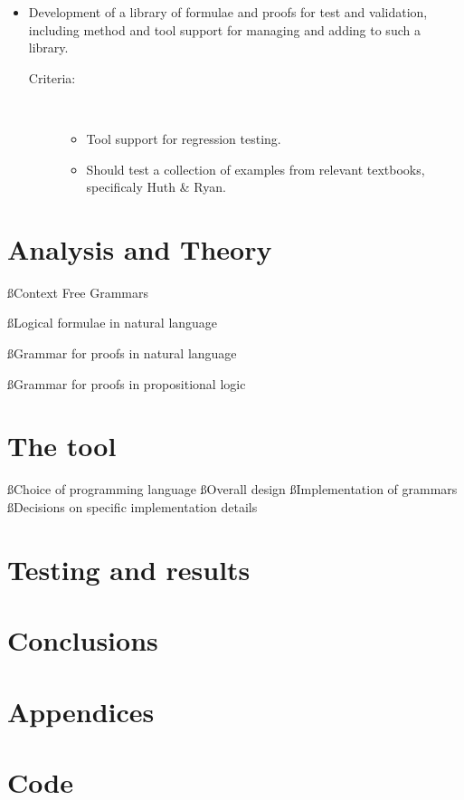 \documentclass[a4paper]{article}
\begin{document}
\begin{itemize}
\item
    Development of a library of formulae and proofs for test and validation,
    including method and tool support for managing and adding to such a 
    library.
    \begin{description}
        \item[Criteria:]~ \\ \vspace{-5 mm}
            \begin{itemize}
                \item Tool support for regression testing.
                \item Should test a collection of examples from relevant
                textbooks, specificaly Huth \& Ryan\cite{hr}.
            \end{itemize}
    \end{description}
\end{itemize}

\section{Analysis and Theory}
\ss{Context Free Grammars}

\ss{Logical formulae in natural language}

\ss{Grammar for proofs in natural language}

\ss{Grammar for proofs in propositional logic}

\section{The tool}
\ss{Choice of programming language}
\ss{Overall design}
\ss{Implementation of grammars}
\ss{Decisions on specific implementation details}

\section{Testing and results}
\section{Conclusions}


\label{LastBody}
\pagebreak
{}


\label{LastBio}
\pagebreak
\appendix
{}
\section*{Appendices}\label{FirstApp}
\section{Code}
\label{LastApp}
\label{LastPage}
\end{document}
